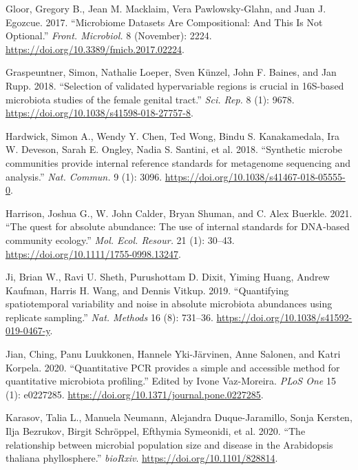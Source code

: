 \documentclass[
]{article}
\newlength{\cslhangindent}
\newlength{\cslentryspacingunit} %
\newenvironment{CSLReferences}[2] %
 {%
  \setlength{\parindent}{0pt}
  \ifodd #1
  \let\oldpar\par
  \def\par{\hangindent=\cslhangindent\oldpar}
  \fi
  \setlength{\parskip}{#2\cslentryspacingunit}
 }%
 {}
\begin{document}
\begin{CSLReferences}{1}{0}
\leavevmode{}%
Gloor, Gregory B., Jean M. Macklaim, Vera Pawlowsky-Glahn, and Juan J. Egozcue. 2017. {``{Microbiome Datasets Are Compositional: And This Is Not Optional}.''} \emph{Front. Microbiol.} 8 (November): 2224. \url{https://doi.org/10.3389/fmicb.2017.02224}.

\leavevmode{}%
Graspeuntner, Simon, Nathalie Loeper, Sven Künzel, John F. Baines, and Jan Rupp. 2018. {``{Selection of validated hypervariable regions is crucial in 16S-based microbiota studies of the female genital tract}.''} \emph{Sci. Rep.} 8 (1): 9678. \url{https://doi.org/10.1038/s41598-018-27757-8}.

\leavevmode{}%
Hardwick, Simon A., Wendy Y. Chen, Ted Wong, Bindu S. Kanakamedala, Ira W. Deveson, Sarah E. Ongley, Nadia S. Santini, et al. 2018. {``{Synthetic microbe communities provide internal reference standards for metagenome sequencing and analysis}.''} \emph{Nat. Commun.} 9 (1): 3096. \url{https://doi.org/10.1038/s41467-018-05555-0}.

\leavevmode{}%
Harrison, Joshua G., W. John Calder, Bryan Shuman, and C. Alex Buerkle. 2021. {``{The quest for absolute abundance: The use of internal standards for DNA‐based community ecology}.''} \emph{Mol. Ecol. Resour.} 21 (1): 30--43. \url{https://doi.org/10.1111/1755-0998.13247}.

\leavevmode{}%
Ji, Brian W., Ravi U. Sheth, Purushottam D. Dixit, Yiming Huang, Andrew Kaufman, Harris H. Wang, and Dennis Vitkup. 2019. {``{Quantifying spatiotemporal variability and noise in absolute microbiota abundances using replicate sampling}.''} \emph{Nat. Methods} 16 (8): 731--36. \url{https://doi.org/10.1038/s41592-019-0467-y}.

\leavevmode{}%
Jian, Ching, Panu Luukkonen, Hannele Yki-Järvinen, Anne Salonen, and Katri Korpela. 2020. {``{Quantitative PCR provides a simple and accessible method for quantitative microbiota profiling}.''} Edited by Ivone Vaz-Moreira. \emph{PLoS One} 15 (1): e0227285. \url{https://doi.org/10.1371/journal.pone.0227285}.

\leavevmode{}%
Karasov, Talia L., Manuela Neumann, Alejandra Duque-Jaramillo, Sonja Kersten, Ilja Bezrukov, Birgit Schröppel, Efthymia Symeonidi, et al. 2020. {``{The relationship between microbial population size and disease in the Arabidopsis thaliana phyllosphere}.''} \emph{bioRxiv}. \url{https://doi.org/10.1101/828814}.


\end{CSLReferences}
\end{document}
